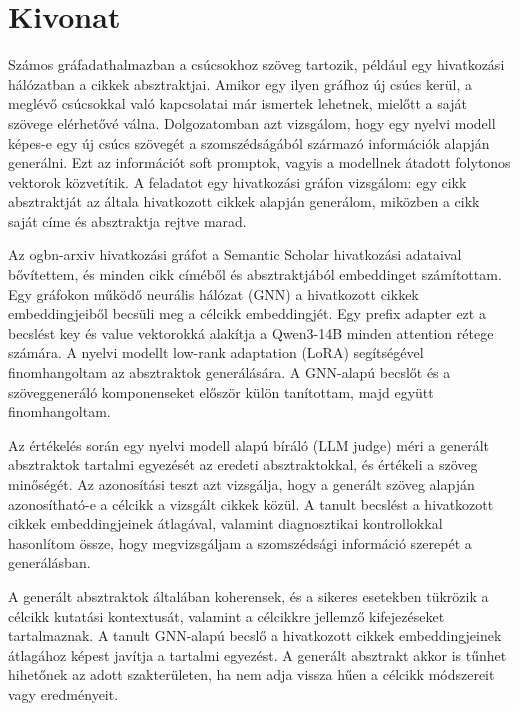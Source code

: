 \setcounter{page}{1}

\selecthungarian

\chapter*{Kivonat}

Számos gráfadathalmazban a csúcsokhoz szöveg tartozik, például egy hivatkozási hálózatban a cikkek absztraktjai. Amikor egy ilyen gráfhoz új csúcs kerül, a meglévő csúcsokkal való kapcsolatai már ismertek lehetnek, mielőtt a saját szövege elérhetővé válna. Dolgozatomban azt vizsgálom, hogy egy nyelvi modell képes-e egy új csúcs szövegét a szomszédságából származó információk alapján generálni. Ezt az információt soft promptok, vagyis a modellnek átadott folytonos vektorok közvetítik. A feladatot egy hivatkozási gráfon vizsgálom: egy cikk absztraktját az általa hivatkozott cikkek alapján generálom, miközben a cikk saját címe és absztraktja rejtve marad.

Az ogbn-arxiv hivatkozási gráfot a Semantic Scholar hivatkozási adataival bővítettem, és minden cikk címéből és absztraktjából embeddinget számítottam. Egy gráfokon működő neurális hálózat (GNN) a hivatkozott cikkek embeddingjeiből becsüli meg a célcikk embeddingjét. Egy prefix adapter ezt a becslést key és value vektorokká alakítja a Qwen3-14B minden attention rétege számára. A nyelvi modellt low-rank adaptation (LoRA) segítségével finomhangoltam az absztraktok generálására. A GNN-alapú becslőt és a szöveggeneráló komponenseket először külön tanítottam, majd együtt finomhangoltam.

Az értékelés során egy nyelvi modell alapú bíráló (LLM judge) méri a generált absztraktok tartalmi egyezését az eredeti absztraktokkal, és értékeli a szöveg minőségét. Az azonosítási teszt azt vizsgálja, hogy a generált szöveg alapján azonosítható-e a célcikk a vizsgált cikkek közül. A tanult becslést a hivatkozott cikkek embeddingjeinek átlagával, valamint diagnosztikai kontrollokkal hasonlítom össze, hogy megvizsgáljam a szomszédsági információ szerepét a generálásban.

A generált absztraktok általában koherensek, és a sikeres esetekben tükrözik a célcikk kutatási kontextusát, valamint a célcikkre jellemző kifejezéseket tartalmaznak. A tanult GNN-alapú becslő a hivatkozott cikkek embeddingjeinek átlagához képest javítja a tartalmi egyezést. A generált absztrakt akkor is tűnhet hihetőnek az adott szakterületen, ha nem adja vissza hűen a célcikk módszereit vagy eredményeit.


